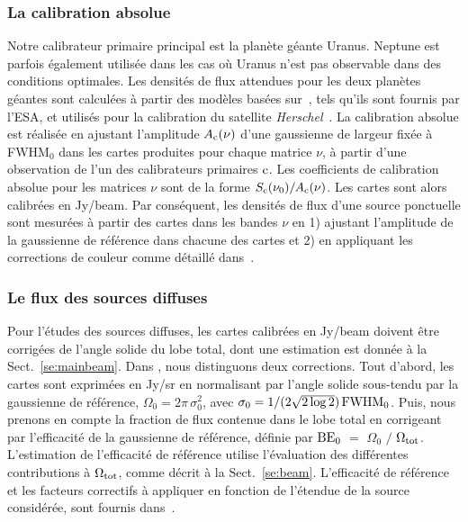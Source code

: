 \subsubsection{La calibration absolue}
Notre calibrateur primaire principal est la planète géante
Uranus. Neptune est parfois également utilisée dans les cas où Uranus
n'est pas observable dans des conditions optimales. Les densités de
flux attendues pour les deux planètes géantes sont calculées à partir
des modèles basées sur~\citet{Morenothesis}, tels qu'ils sont fournis par
l'ESA, et utilisés pour la calibration du satellite
\emph{Herschel}~\citep{Bendo2013}. La calibration absolue est réalisée
en ajustant l'amplitude $A_{\rm{c}}(\nu)$ d'une gaussienne de largeur
fixée à FWHM$_0$ dans les cartes produites pour chaque matrice $\nu$,
à partir d'une observation de l'un des calibrateurs primaires
$\rm{c}$. Les coefficients de calibration absolue pour les matrices
$\nu$ sont de la forme $S_{\rm{c}}(\nu_0) / A_{\rm{c}}(\nu)$. Les
cartes sont alors calibrées en Jy/beam. Par conséquent, les densités
de flux d'une source ponctuelle sont mesurées à partir des cartes dans
les bandes $\nu$ en 1) ajustant l'amplitude de la gaussienne de
référence dans chacune des cartes et 2) en appliquant les corrections
de couleur comme détaillé dans~\citet{Perotto2019}.

\subsubsection{Le flux des sources diffuses}

Pour l'études des sources diffuses, les cartes calibrées en Jy/beam
doivent être corrigées de l'angle solide du lobe total, dont une
estimation est donnée à la Sect.~\ref{se:mainbeam}. Dans
\citet{Perotto2019}, nous distinguons deux corrections. Tout d'abord,
les cartes sont exprimées en Jy/sr en normalisant par l'angle solide sous-tendu
par la gaussienne de référence, $\Omega_0 = 2\pi \, \sigma_0^2$, avec
$\sigma_0 = 1/(2\sqrt{2 \log{2}})\, \rm{FWHM}_0$. Puis, nous prenons
en compte la fraction de flux contenue dans le lobe total en
corrigeant par l'efficacité de la gaussienne de référence, définie par
$\rm{BE}_{0}$ $=$ $\Omega_{0}$ $/$ $\Omega_{\rm{tot}}$.
L'estimation de l'efficacité
de référence utilise l'évaluation des différentes contributions à
$\Omega_{\rm{tot}}$, comme décrit à la
Sect.~\ref{se:beam}. L'efficacité de référence et les facteurs
correctifs à appliquer en fonction de l'étendue de la source
considérée, sont fournis dans~\citet{Perotto2019}.


